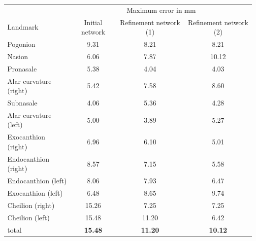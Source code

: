 \documentclass[class=article, crop=false]{standalone}
\begin{document}
\begin{table}[!htbp]
\label{table:horizflip_rgb_max}
\begin{tabularx}{\textwidth}{l|c|c|c}
\toprule
 & \multicolumn{3}{c}{Maximum error in mm} \\\cmidrule(lr){2-4}
Landmark               & \hspace{0.5cm}Initial network\hspace{0.5cm} &  \hspace{0.5cm}Refinement network (1)   \hspace{0.5cm} & \hspace{0.5cm} Refinement network (2)  \hspace{0.5cm}
\\
\midrule
Pogonion               & 9.31  & 8.21 & 8.21 \\
Nasion                 & 6.06 & 7.87 & 10.12\\  
Pronasale              & 5.38 & 4.04 & 4.03\\
Alar curvature (right) & 5.42 & 7.58 & 8.60\\
Subnasale              & 4.06 & 5.36 & 4.28\\
Alar curvature (left)  & 5.00 & 3.89 & 5.27\\   
Exocanthion (right)    & 6.96 & 6.10 & 5.01\\ 
Endocanthion (right)   & 8.57 & 7.15 & 5.58\\ 
Endocanthion (left)    & 8.06 & 7.93 & 6.47\\
Exocanthion (left)     & 6.48  & 8.65 & 9.74\\
Cheilion (right)       & 15.26 & 7.25 & 7.25\\
Cheilion (left)        & 15.48 & 11.20 & 6.42\\

\bottomrule
total & \textbf{15.48} & \textbf{11.20} & \textbf{10.12}
\end{tabularx}
\end{table}
\end{document}
